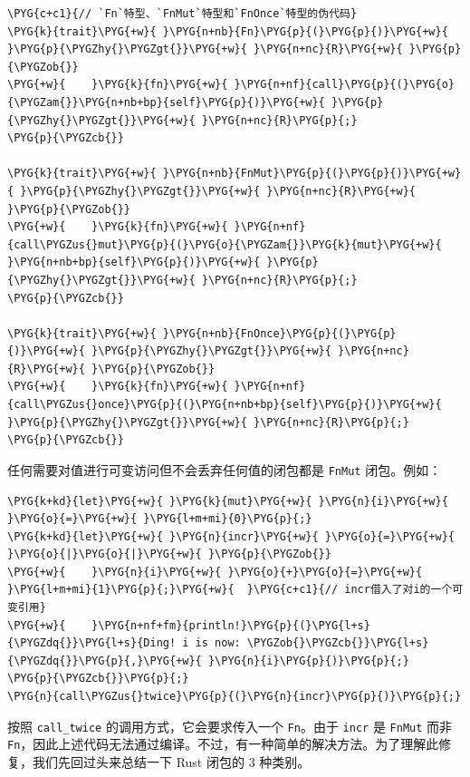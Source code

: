 \begin{Verbatim}[commandchars=\\\{\},breaklines=true,breakanywhere=true,fontsize=\codefont,xleftmargin=17bp]
\PYG{c+c1}{// `Fn`特型、`FnMut`特型和`FnOnce`特型的伪代码}
\PYG{k}{trait}\PYG{+w}{ }\PYG{n+nb}{Fn}\PYG{p}{(}\PYG{p}{)}\PYG{+w}{ }\PYG{p}{\PYGZhy{}\PYGZgt{}}\PYG{+w}{ }\PYG{n+nc}{R}\PYG{+w}{ }\PYG{p}{\PYGZob{}}
\PYG{+w}{    }\PYG{k}{fn}\PYG{+w}{ }\PYG{n+nf}{call}\PYG{p}{(}\PYG{o}{\PYGZam{}}\PYG{n+nb+bp}{self}\PYG{p}{)}\PYG{+w}{ }\PYG{p}{\PYGZhy{}\PYGZgt{}}\PYG{+w}{ }\PYG{n+nc}{R}\PYG{p}{;}
\PYG{p}{\PYGZcb{}}

\PYG{k}{trait}\PYG{+w}{ }\PYG{n+nb}{FnMut}\PYG{p}{(}\PYG{p}{)}\PYG{+w}{ }\PYG{p}{\PYGZhy{}\PYGZgt{}}\PYG{+w}{ }\PYG{n+nc}{R}\PYG{+w}{ }\PYG{p}{\PYGZob{}}
\PYG{+w}{    }\PYG{k}{fn}\PYG{+w}{ }\PYG{n+nf}{call\PYGZus{}mut}\PYG{p}{(}\PYG{o}{\PYGZam{}}\PYG{k}{mut}\PYG{+w}{ }\PYG{n+nb+bp}{self}\PYG{p}{)}\PYG{+w}{ }\PYG{p}{\PYGZhy{}\PYGZgt{}}\PYG{+w}{ }\PYG{n+nc}{R}\PYG{p}{;}
\PYG{p}{\PYGZcb{}}

\PYG{k}{trait}\PYG{+w}{ }\PYG{n+nb}{FnOnce}\PYG{p}{(}\PYG{p}{)}\PYG{+w}{ }\PYG{p}{\PYGZhy{}\PYGZgt{}}\PYG{+w}{ }\PYG{n+nc}{R}\PYG{+w}{ }\PYG{p}{\PYGZob{}}
\PYG{+w}{    }\PYG{k}{fn}\PYG{+w}{ }\PYG{n+nf}{call\PYGZus{}once}\PYG{p}{(}\PYG{n+nb+bp}{self}\PYG{p}{)}\PYG{+w}{ }\PYG{p}{\PYGZhy{}\PYGZgt{}}\PYG{+w}{ }\PYG{n+nc}{R}\PYG{p}{;}
\PYG{p}{\PYGZcb{}}
\end{Verbatim}

任何需要对值进行可变访问但不会丢弃任何值的闭包都是 \texttt{FnMut} 闭包。例如：

\begin{Verbatim}[commandchars=\\\{\},breaklines=true,breakanywhere=true,fontsize=\codefont,xleftmargin=17bp]
\PYG{k+kd}{let}\PYG{+w}{ }\PYG{k}{mut}\PYG{+w}{ }\PYG{n}{i}\PYG{+w}{ }\PYG{o}{=}\PYG{+w}{ }\PYG{l+m+mi}{0}\PYG{p}{;}
\PYG{k+kd}{let}\PYG{+w}{ }\PYG{n}{incr}\PYG{+w}{ }\PYG{o}{=}\PYG{+w}{ }\PYG{o}{|}\PYG{o}{|}\PYG{+w}{ }\PYG{p}{\PYGZob{}}
\PYG{+w}{    }\PYG{n}{i}\PYG{+w}{ }\PYG{o}{+}\PYG{o}{=}\PYG{+w}{ }\PYG{l+m+mi}{1}\PYG{p}{;}\PYG{+w}{  }\PYG{c+c1}{// incr借入了对i的一个可变引用}
\PYG{+w}{    }\PYG{n+nf+fm}{println!}\PYG{p}{(}\PYG{l+s}{\PYGZdq{}}\PYG{l+s}{Ding! i is now: \PYGZob{}\PYGZcb{}}\PYG{l+s}{\PYGZdq{}}\PYG{p}{,}\PYG{+w}{ }\PYG{n}{i}\PYG{p}{)}\PYG{p}{;}
\PYG{p}{\PYGZcb{}}\PYG{p}{;}
\PYG{n}{call\PYGZus{}twice}\PYG{p}{(}\PYG{n}{incr}\PYG{p}{)}\PYG{p}{;}
\end{Verbatim}

按照 \texttt{call\_twice} 的调用方式，它会要求传入一个 \texttt{Fn}。由于 \texttt{incr} 是 \texttt{FnMut} 而非 \texttt{Fn}，因此上述代码无法通过编译。不过，有一种简单的解决方法。为了理解此修复，我们先回过头来总结一下 Rust 闭包的 3 种类别。

